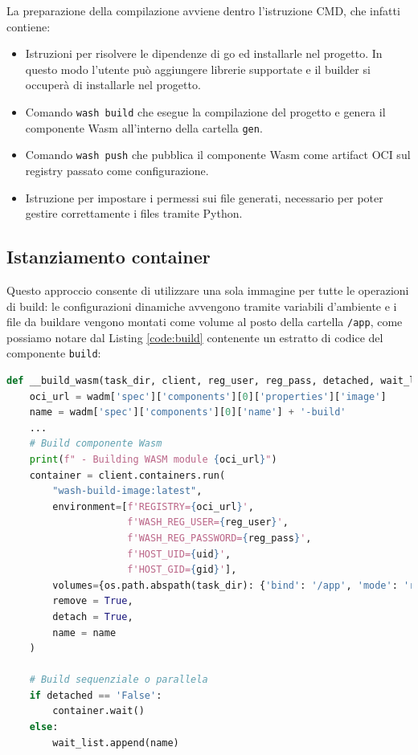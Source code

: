 La preparazione della compilazione avviene dentro l'istruzione CMD, che infatti contiene:
\begin{itemize}
    \item Istruzioni per risolvere le dipendenze di go ed installarle nel progetto. In questo modo l'utente può aggiungere librerie supportate e il builder si occuperà di installarle nel progetto.
    \item Comando \texttt{wash build} che esegue la compilazione del progetto e genera il componente Wasm all'interno della cartella \texttt{gen}.
    \item Comando \texttt{wash push} che pubblica il componente Wasm come artifact OCI sul registry passato come configurazione.
    \item Istruzione per impostare i permessi sui file generati, necessario per poter gestire correttamente i files tramite Python.
\end{itemize}

\subsection{Istanziamento container}

Questo approccio consente di utilizzare una sola immagine per tutte le operazioni di build: le configurazioni dinamiche avvengono tramite variabili d'ambiente e i file da buildare vengono montati come volume al posto della cartella \texttt{/app}, come possiamo notare dal Listing \ref{code:build} contenente un estratto di codice del componente \texttt{build}:

\begin{lstlisting}[language=python, caption={Build componente Wasm con Docker}, captionpos=b, label={code:build}]
def __build_wasm(task_dir, client, reg_user, reg_pass, detached, wait_list):
    oci_url = wadm['spec']['components'][0]['properties']['image']
    name = wadm['spec']['components'][0]['name'] + '-build'
    ...
    # Build componente Wasm
    print(f" - Building WASM module {oci_url}")
    container = client.containers.run(
        "wash-build-image:latest",
        environment=[f'REGISTRY={oci_url}',
                     f'WASH_REG_USER={reg_user}',
                     f'WASH_REG_PASSWORD={reg_pass}',
                     f'HOST_UID={uid}',
                     f'HOST_GID={gid}'],
        volumes={os.path.abspath(task_dir): {'bind': '/app', 'mode': 'rw'}},
        remove = True,
        detach = True,
        name = name
    )
    
    # Build sequenziale o parallela
    if detached == 'False':
        container.wait()
    else:
        wait_list.append(name)
\end{lstlisting}

